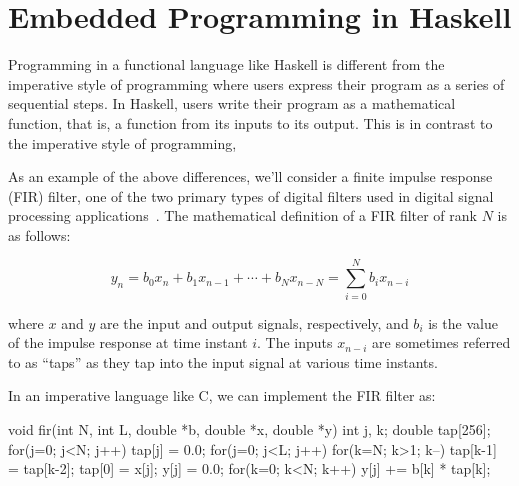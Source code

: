 \documentclass[../main.tex]{subfiles}
\begin{document}
\section{Embedded Programming in Haskell}
\label{embedded}

Programming in a functional language like Haskell is different from the imperative style of programming where users express their program as a series of sequential steps. In Haskell, users write their program as a mathematical function, that is, a function from its inputs to its output. This is in contrast to the imperative style of programming, 


As an example of the above differences, we'll consider a finite impulse response (FIR) filter, one of the two primary types of digital filters used in digital signal processing applications~\cite{oppenheim1989}. The mathematical definition of a FIR filter of rank $N$ is as follows:


\vspace{-2mm}
\begin{equation}
y_{n} = b_{0} x_{n} + b_{1} x_{n-1} + \cdots + b_{N} x_{n-N} = \sum_{i=0}^{N} b_{i} x_{n-i}
\end{equation}
\vspace{1mm}

\noindent where $x$ and $y$ are the input and output signals, respectively, and $b_i$ is the value of the impulse response at time instant $i$. The inputs $x_{n-i}$ are sometimes referred to as ``taps'' as they tap into the input signal at various time instants. 

In an imperative language like C, we can implement the FIR filter as:

\begin{code}
void fir(int N, int L, double *b, double *x, double *y)
{
 int j, k;
 double tap[256];
 for(j=0; j<N; j++) tap[j] = 0.0;
 for(j=0; j<L; j++)
 {
  for(k=N; k>1; k--) tap[k-1] = tap[k-2];
  tap[0] = x[j];
  y[j] = 0.0;
  for(k=0; k<N; k++) y[j] += b[k] * tap[k];
 }
}
\end{code}
\end{document}
